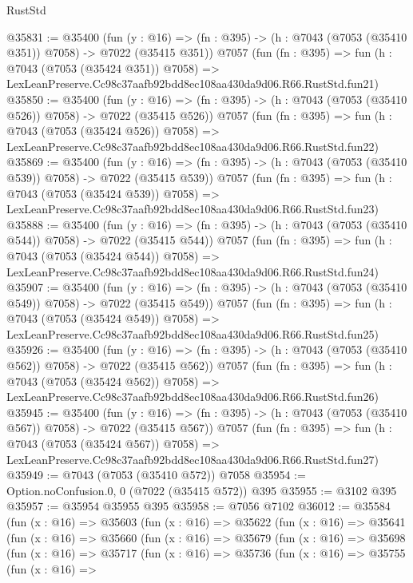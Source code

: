 \begin{lexlean}{RustStd}
\begin{coremodule}
@35831 := @35400
    (fun (y : @16) => (fn : @395) -> (h : @7043 (@7053 (@35410 @351)) @7058) -> @7022 (@35415 @351))
    @7057
    (fun (fn : @395) =>
    fun (h : @7043 (@7053 (@35424 @351)) @7058) =>
    LexLeanPreserve.Cc98c37aafb92bdd8ec108aa430da9d06.R66.RustStd.fun21)
@35850 := @35400
    (fun (y : @16) => (fn : @395) -> (h : @7043 (@7053 (@35410 @526)) @7058) -> @7022 (@35415 @526))
    @7057
    (fun (fn : @395) =>
    fun (h : @7043 (@7053 (@35424 @526)) @7058) =>
    LexLeanPreserve.Cc98c37aafb92bdd8ec108aa430da9d06.R66.RustStd.fun22)
@35869 := @35400
    (fun (y : @16) => (fn : @395) -> (h : @7043 (@7053 (@35410 @539)) @7058) -> @7022 (@35415 @539))
    @7057
    (fun (fn : @395) =>
    fun (h : @7043 (@7053 (@35424 @539)) @7058) =>
    LexLeanPreserve.Cc98c37aafb92bdd8ec108aa430da9d06.R66.RustStd.fun23)
@35888 := @35400
    (fun (y : @16) => (fn : @395) -> (h : @7043 (@7053 (@35410 @544)) @7058) -> @7022 (@35415 @544))
    @7057
    (fun (fn : @395) =>
    fun (h : @7043 (@7053 (@35424 @544)) @7058) =>
    LexLeanPreserve.Cc98c37aafb92bdd8ec108aa430da9d06.R66.RustStd.fun24)
@35907 := @35400
    (fun (y : @16) => (fn : @395) -> (h : @7043 (@7053 (@35410 @549)) @7058) -> @7022 (@35415 @549))
    @7057
    (fun (fn : @395) =>
    fun (h : @7043 (@7053 (@35424 @549)) @7058) =>
    LexLeanPreserve.Cc98c37aafb92bdd8ec108aa430da9d06.R66.RustStd.fun25)
@35926 := @35400
    (fun (y : @16) => (fn : @395) -> (h : @7043 (@7053 (@35410 @562)) @7058) -> @7022 (@35415 @562))
    @7057
    (fun (fn : @395) =>
    fun (h : @7043 (@7053 (@35424 @562)) @7058) =>
    LexLeanPreserve.Cc98c37aafb92bdd8ec108aa430da9d06.R66.RustStd.fun26)
@35945 := @35400
    (fun (y : @16) => (fn : @395) -> (h : @7043 (@7053 (@35410 @567)) @7058) -> @7022 (@35415 @567))
    @7057
    (fun (fn : @395) =>
    fun (h : @7043 (@7053 (@35424 @567)) @7058) =>
    LexLeanPreserve.Cc98c37aafb92bdd8ec108aa430da9d06.R66.RustStd.fun27)
@35949 := @7043 (@7053 (@35410 @572)) @7058
@35954 := Option.noConfusion.{0, 0} (@7022 (@35415 @572)) @395
@35955 := @3102 @395
@35957 := @35954 @35955 @395
@35958 := @7056 @7102
@36012 := @35584
    (fun (x : @16) =>
    @35603
      (fun (x : @16) =>
      @35622
        (fun (x : @16) =>
        @35641
          (fun (x : @16) =>
          @35660
            (fun (x : @16) =>
            @35679
              (fun (x : @16) =>
              @35698
                (fun (x : @16) =>
                @35717
                  (fun (x : @16) =>
                  @35736
                    (fun (x : @16) =>
                    @35755
                      (fun (x : @16) =>

\end{coremodule}
\end{lexlean}
